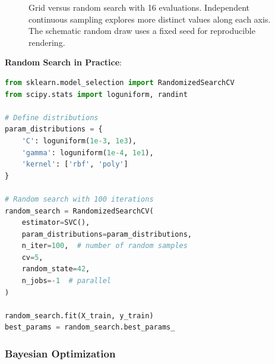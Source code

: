 \documentclass[11pt,twoside]{article}
\numberwithin{equation}{section}
\theoremstyle{plain}
\theoremstyle{definition}
\theoremstyle{remark}
\begin{document}
\begin{figure}[H]
\centering
{}
\caption{Grid versus random search with 16 evaluations. Independent continuous sampling explores more distinct values along each axis. The schematic random draw uses a fixed seed for reproducible rendering.}
\end{figure}

\begin{implementationbox}
\textbf{Random Search in Practice}:

\begin{lstlisting}[language=Python]
from sklearn.model_selection import RandomizedSearchCV
from scipy.stats import loguniform, randint

# Define distributions
param_distributions = {
    'C': loguniform(1e-3, 1e3),
    'gamma': loguniform(1e-4, 1e1),
    'kernel': ['rbf', 'poly']
}

# Random search with 100 iterations
random_search = RandomizedSearchCV(
    estimator=SVC(),
    param_distributions=param_distributions,
    n_iter=100,  # number of random samples
    cv=5,
    random_state=42,
    n_jobs=-1  # parallel
)

random_search.fit(X_train, y_train)
best_params = random_search.best_params_
\end{lstlisting}
\end{implementationbox}

\subsubsection{Bayesian Optimization}
\end{document}
